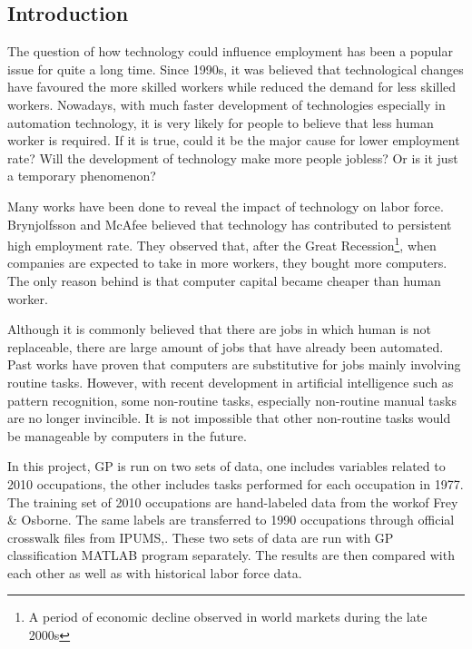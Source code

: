 \documentclass[11pt]{report}
\numberwithin{equation}{chapter}
\begin{document}
\begin{spacing}{2}

\newpage
{}
\setcounter{page}{1}



\chapter{Introduction}
The question of how technology could influence employment has been a popular issue for quite a long time\cite{machin1998}. Since 1990s, it was believed that technological changes have favoured the more skilled workers while reduced the demand for less skilled workers\cite{bound1989changes}. Nowadays, with much faster development of technologies especially in automation technology, it is very likely for people to believe that less human worker is required. If it is true, could it be the major cause for lower employment rate? Will the development of technology make more people jobless? Or is it just a temporary phenomenon? 

Many works have been done to reveal the impact of technology on labor force. Brynjolfsson and McAfee\cite{brynjolfsson2012race} believed that technology has contributed to persistent high employment rate. They observed that, after the Great Recession\footnote{A period of economic decline observed in world markets during the late 2000s}, when companies are expected to take in more workers, they bought more computers. The only reason behind is that computer capital became cheaper than human worker. 

Although it is commonly believed that there are jobs in which human is not replaceable\cite{levy2012new}, there are large amount of jobs that have already been automated. Past works have proven that computers are substitutive for jobs mainly involving routine tasks\cite{david2001skill}. However, with recent development in artificial intelligence such as pattern recognition, some non-routine tasks, especially non-routine manual tasks are no longer invincible.  It is not impossible that other non-routine tasks would be manageable by computers in the future.

In this project, GP is run on two sets of data, one includes variables related to 2010 occupations, the other includes tasks performed for each occupation in 1977\cite{david2001skill}. The training set of 2010 occupations are hand-labeled data from the workof Frey \& Osborne\cite{frey2013future}. The same labels are transferred to 1990 occupations through official crosswalk files from IPUMS\cite{SOC2010_2000},\cite{SOC2000_OCC}\cite{OCC2000_1990}. These two sets of data are run with GP classification MATLAB program separately. The results are then compared with each other as well as with historical labor force data\cite{IPUMS1990}. 


\end{spacing}
\end{document}
